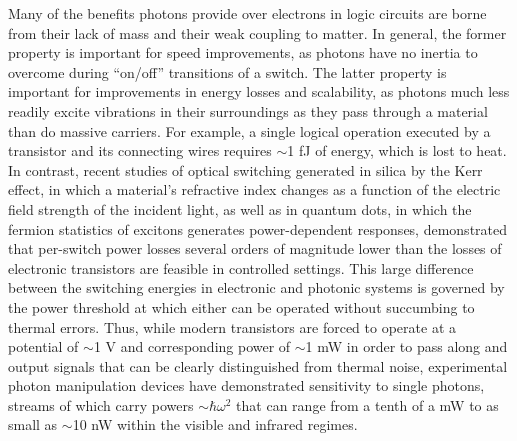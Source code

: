 \documentclass[11pt,a4paper]{article}
\begin{document}
 






Many of the benefits photons provide over electrons in logic circuits are borne from their lack of mass and their weak coupling to matter. In general, the former property is important for speed improvements, as photons have no inertia to overcome during ``on/off'' transitions of a switch. The latter property is important for improvements in energy losses and scalability, as photons much less readily excite vibrations in their surroundings as they pass through a material than do massive carriers. For example, a single logical operation executed by a transistor and its connecting wires requires $\sim$1 fJ of energy, which is lost to heat.\supercite{miller_device_1990,pop_heat_2006,assad_performance_2000} In contrast, recent studies of optical switching generated in silica by the Kerr effect, in which a material's refractive index changes as a function of the electric field strength of the incident light, as well as in quantum dots, in which the fermion statistics of excitons generates power-dependent responses, demonstrated that per-switch power losses several orders of magnitude lower than the losses of electronic transistors are feasible in controlled settings.\supercite{sommer_attosecond_2016,munoz-matutano_all_2020} This large difference between the switching energies in electronic and photonic systems is governed by the power threshold at which either can be operated without succumbing to thermal errors. Thus, while modern transistors are forced to operate at a potential of $\sim$1 V and corresponding power of $\sim$1 mW in order to pass along and output signals that can be clearly distinguished from thermal noise,\supercite{assad_performance_2000} experimental photon manipulation devices have demonstrated sensitivity to single photons, streams of which carry powers $\sim\hbar\omega^2$ that can range from a tenth of a mW to as small as $\sim$10 nW within the visible and infrared regimes.\supercite{slussarenko_photonic_2019}
\end{document}
